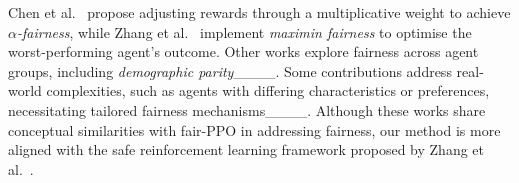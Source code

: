 Chen et al.~ propose adjusting rewards through a multiplicative weight to achieve $\alpha$\textit{-fairness}, while Zhang et al.~ implement \textit{maximin fairness} to optimise the worst-performing agent's outcome. Other works explore fairness across agent groups, including \textit{demographic parity}____. Some contributions address real-world complexities, such as agents with differing characteristics or preferences, necessitating tailored fairness mechanisms____. Although these works share conceptual similarities with fair-PPO in addressing fairness, our method is more aligned with the safe reinforcement learning framework proposed by Zhang et al.~.
